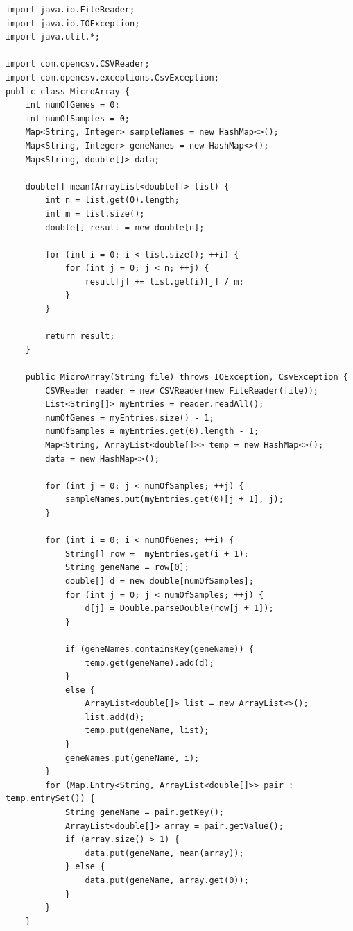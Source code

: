 \documentclass[]{final_report}
\begin{document}
\begin{verbatim}
import java.io.FileReader;
import java.io.IOException;
import java.util.*;

import com.opencsv.CSVReader;
import com.opencsv.exceptions.CsvException;
public class MicroArray {
    int numOfGenes = 0;
    int numOfSamples = 0;
    Map<String, Integer> sampleNames = new HashMap<>();
    Map<String, Integer> geneNames = new HashMap<>();
    Map<String, double[]> data;

    double[] mean(ArrayList<double[]> list) {
        int n = list.get(0).length;
        int m = list.size();
        double[] result = new double[n];

        for (int i = 0; i < list.size(); ++i) {
            for (int j = 0; j < n; ++j) {
                result[j] += list.get(i)[j] / m;
            }
        }

        return result;
    }

    public MicroArray(String file) throws IOException, CsvException {
        CSVReader reader = new CSVReader(new FileReader(file));
        List<String[]> myEntries = reader.readAll();
        numOfGenes = myEntries.size() - 1;
        numOfSamples = myEntries.get(0).length - 1;
        Map<String, ArrayList<double[]>> temp = new HashMap<>();
        data = new HashMap<>();

        for (int j = 0; j < numOfSamples; ++j) {
            sampleNames.put(myEntries.get(0)[j + 1], j);
        }

        for (int i = 0; i < numOfGenes; ++i) {
            String[] row =  myEntries.get(i + 1);
            String geneName = row[0];
            double[] d = new double[numOfSamples];
            for (int j = 0; j < numOfSamples; ++j) {
                d[j] = Double.parseDouble(row[j + 1]);
            }

            if (geneNames.containsKey(geneName)) {
                temp.get(geneName).add(d);
            }
            else {
                ArrayList<double[]> list = new ArrayList<>();
                list.add(d);
                temp.put(geneName, list);
            }
            geneNames.put(geneName, i);
        }
        for (Map.Entry<String, ArrayList<double[]>> pair : temp.entrySet()) {
            String geneName = pair.getKey();
            ArrayList<double[]> array = pair.getValue();
            if (array.size() > 1) {
                data.put(geneName, mean(array));
            } else {
                data.put(geneName, array.get(0));
            }
        }
    }

\end{verbatim}
\end{document}
